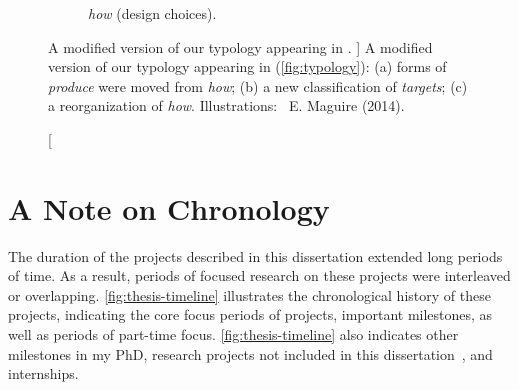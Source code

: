 {\begin{figure}
\begin{subfigure}[t]{\textwidth}
        \caption{{\it how} (design choices).}
    \end{subfigure}
	\caption
	[
	    A modified version of our typology appearing in \citet{Munzner2014}.
	]{
    	A modified version of our typology appearing in \citet{Munzner2014} (\cf \autoref{fig:typology}): (a) forms of {\it produce} were moved from {\it how}; (b) a new classification of {\it targets}; (c) a reorganization of {\it how}. Illustrations: \ccLogo~E. Maguire (2014).
	}
	\centering
	\label{fig:typology-extension}
\end{figure}


\section{A Note on Chronology}
\label{intro:chronology}


The duration of the projects described in this dissertation extended long periods of time.
As a result, periods of focused research on these projects were interleaved or overlapping.
\autoref{fig:thesis-timeline} illustrates the chronological history of these projects, indicating the core focus periods of projects, important milestones, as well as periods of part-time focus.
\autoref{fig:thesis-timeline} also indicates other milestones in my PhD, research projects not included in this dissertation~\cite{Brehmer2014a,Fulda2015}, and internships.


}
